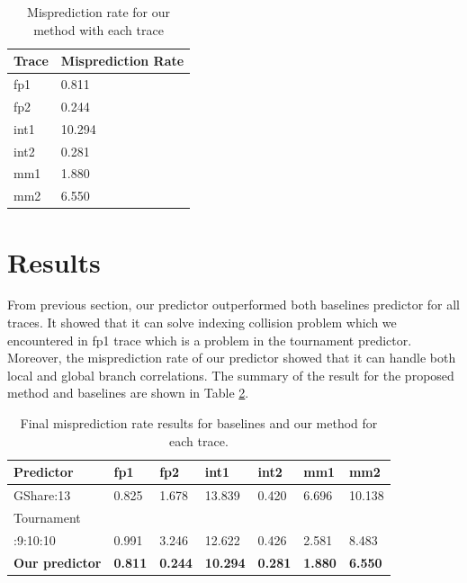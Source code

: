 \documentclass[conference]{IEEEtran}
\begin{document}
\begin{scriptsize}
\begin{table}[h!]
  \centering
  \caption{Misprediction rate for our method with each trace}
  \label{table:our_performance}
  \begin{tabular}{|l|l|}
    \hline
    \textbf{Trace} & \textbf{Misprediction Rate}\\
    \hline
    \hline
    fp1 & 0.811 \\
    \hline
    fp2 & 0.244 \\
    \hline
    int1 & 10.294 \\
    \hline
    int2 & 0.281 \\
    \hline
    mm1 & 1.880 \\
    \hline
    mm2 & 6.550 \\
    \hline
  \end{tabular}
\end{table}
\end{scriptsize}
\section{Results}

From previous section, our predictor outperformed both baselines predictor
for all traces. It showed that it can solve indexing collision problem which we encountered
in fp1 trace which is a problem in the tournament predictor. Moreover, the
misprediction rate of our predictor showed that it can handle both local and global
branch correlations. The summary of the result for the proposed method and baselines
are shown in Table \ref{table:result}.

\begin{scriptsize}
\begin{table}[h!]
  \centering
  \caption{Final misprediction rate results for baselines and our method for each trace.}
  \label{table:result}
  \begin{tabular}{|l|l|l|l|l|l|l|}
    \hline
    \textbf{Predictor} & \textbf{fp1} & \textbf{fp2} & \textbf{int1} &\textbf{int2} & \textbf{mm1} & \textbf{mm2}\\
    \hline
    \hline
    GShare:13 & 0.825 & 1.678 & 13.839 & 0.420 & 6.696 & 10.138 \\
    \hline
    Tournament & & & & & & \\
    :9:10:10 & 0.991 & 3.246 & 12.622 & 0.426 & 2.581 & 8.483 \\
    \hline
    \hline
    \textbf{Our predictor} & \textbf{0.811} & \textbf{0.244} & \textbf{10.294} & \textbf{0.281} & \textbf{1.880} & \textbf{6.550} \\
    \hline
  \end{tabular}
\end{table}
\end{scriptsize}
\end{document}
